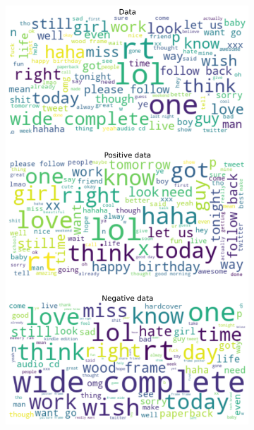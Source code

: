 \documentclass{article}
\begin{document}
\begin{itemize}
\begin{figure}[H]
\begin{subfigure}[b]{0.24\textwidth}
      \includegraphics[width=\textwidth]{chapter-06/section-01-01/11/visualization/3/wordcloud.png}
    \end{subfigure}
    \begin{subfigure}[b]{0.24\textwidth}
      \centering

\end{subfigure}
\end{figure}
\end{itemize}
\end{document}
